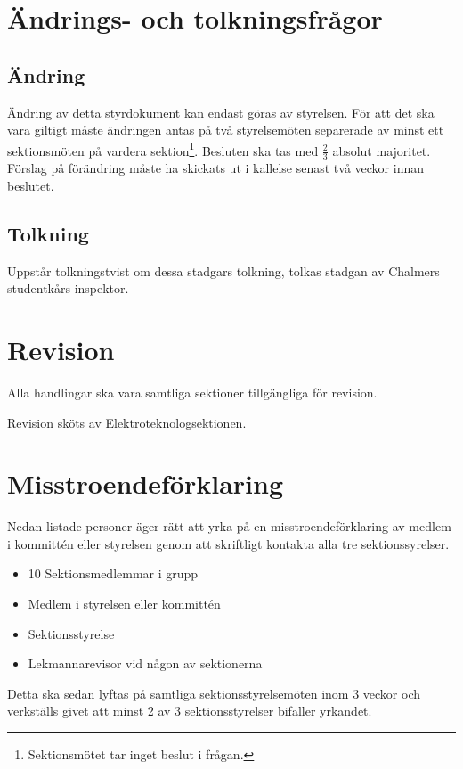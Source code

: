 \documentclass{article}
\begin{document}
\section{Ändrings- och tolkningsfrågor}
\subsection{Ändring}
Ändring av detta styrdokument kan endast göras av styrelsen. För att det ska vara giltigt måste ändringen antas på två styrelsemöten separerade av minst ett sektionsmöten på vardera sektion\footnote{Sektionsmötet tar inget beslut i frågan.}. Besluten ska tas med $\frac{2}{3}$ absolut majoritet. Förslag på förändring måste ha skickats ut i kallelse senast två veckor innan beslutet.

\subsection{Tolkning}
Uppstår tolkningstvist om dessa stadgars tolkning, tolkas stadgan av Chalmers studentkårs inspektor.

\section{Revision}
Alla handlingar ska vara samtliga sektioner tillgängliga för revision.

Revision sköts av Elektroteknologsektionen.

\section{Misstroendeförklaring}
Nedan listade personer äger rätt att yrka på en misstroendeförklaring av medlem i kommittén eller styrelsen genom att skriftligt kontakta alla tre sektionssyrelser. 
\begin{itemize}
    \item 10 Sektionsmedlemmar i grupp
    \item Medlem i styrelsen eller kommittén
    \item Sektionsstyrelse
    \item Lekmannarevisor vid någon av sektionerna
\end{itemize}

Detta ska sedan lyftas på samtliga sektionsstyrelsemöten inom 3 veckor och verkställs givet att minst 2 av 3 sektionsstyrelser bifaller yrkandet.
\end{document}

